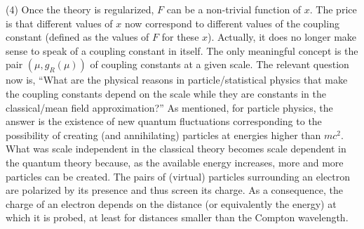 \documentclass[floatfix,twocolumn,preprintnumbers,amsmath,amssymb,prb]{revtex4}
\begin{document}
{(4) Once the theory is regularized, $F$ can be a non-trivial
function of $x$. The price is that different values
of $x$ now correspond to different values of the coupling constant
(defined as the values of $F$ for these $x$). Actually, it does
no longer make sense to speak of a coupling constant in itself.
The only meaningful concept is the pair $(\mu,g_R(\mu))$
of coupling constants at a given scale. The relevant question
now is, ``What are the physical reasons in particle/statistical
physics that make the coupling constants depend on the scale while
they are constants in the classical/mean field approximation?'' As 
mentioned, for particle physics, the answer is the existence of
new quantum fluctuations corresponding to the possibility of
creating (and annihilating) particles at energies higher than $m
c^2$. What was scale independent in the classical theory becomes
scale dependent in the quantum theory because, as the available
energy increases, more and more particles can be created. The
pairs of (virtual) particles surrounding an electron are polarized
by its presence and thus screen its charge. As a consequence, the
charge of an electron depends on the distance (or equivalently the
energy) at which it is probed, at least for distances smaller than
the Compton wavelength. 

}
\end{document}
